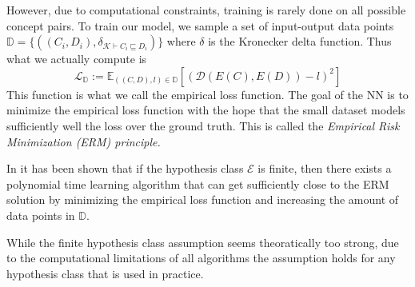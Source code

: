 However, due to computational constraints, 
training is rarely done on all possible concept pairs. To train our model, we sample a set of input-output
data points $\mathbb{D}=\{((C_i,D_i),\delta_{\mathcal{K}\vdash C_i\sqsubseteq D_i})\}$
where $\delta$ is the Kronecker delta function.
Thus what we actually compute is
\[
    \mathcal{L}_{\mathbb{D}}:=\mathbb{E}_{((C,D),l)\in\mathbb{D}}[(\mathcal{D}(E(C),E(D))-l)^2]
\]
This function is what we call the empirical loss function. The goal of the NN is to minimize the empirical loss function
with the hope that the small dataset models sufficiently well the loss over the ground truth.
This is called the \it{Empirical Risk Minimization} (ERM) principle.

In \cite{AgnosticPAC} it has been shown that if the hypothesis class $\mathcal{E}$ is finite, 
then there exists a polynomial time learning algorithm
that can get sufficiently close to the ERM solution by minimizing the empirical loss function
and increasing the amount of data points in $\mathbb{D}$.

While the finite hypothesis class assumption seems theoratically too strong,
due to the computational limitations of all algorithms
the assumption holds for any hypothesis class that is used in practice.
